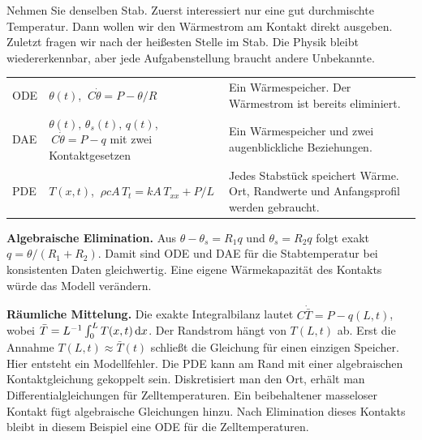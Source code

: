 Nehmen Sie denselben Stab. Zuerst interessiert nur eine gut durchmischte Temperatur. Dann wollen wir den Wärmestrom am Kontakt direkt ausgeben. Zuletzt fragen wir nach der heißesten Stelle im Stab. Die Physik bleibt wiedererkennbar, aber jede Aufgabenstellung braucht andere Unbekannte.
{\tblstart\begin{tabularx}{\linewidth}{@{}P{17mm}YY@{}}\toprule
{}&&\\\midrule
ODE&\(\theta(t)\), \(\ C\dot\theta=P-\theta/R\)&Ein Wärmespeicher. Der Wärmestrom ist bereits eliminiert.\\
DAE&\(\theta(t),\,\theta_s(t),\,q(t)\), \(\ C\dot\theta=P-q\) mit zwei Kontaktgesetzen&Ein Wärmespeicher und zwei augenblickliche Beziehungen.\\
PDE&\(T(x,t)\), \(\ \rho c A\,T_t=kA\,T_{xx}+P/L\)&Jedes Stabstück speichert Wärme. Ort, Randwerte und Anfangsprofil werden gebraucht.\\\bottomrule
\end{tabularx}\par}
\textbf{Algebraische Elimination.} Aus \(\theta-\theta_s=R_1q\) und \(\theta_s=R_2q\) folgt exakt \(q=\theta/(R_1+R_2)\). Damit sind ODE und DAE für die Stabtemperatur bei konsistenten Daten gleichwertig. Eine eigene Wärmekapazität des Kontakts würde das Modell verändern.

\textbf{Räumliche Mittelung.} Die exakte Integralbilanz lautet \(C\dot{\bar T}=P-q(L,t)\), wobei \(\bar T=L^{-1}\int_0^L T(x,t)\,\mathrm{d} x\). Der Randstrom hängt von \(T(L,t)\) ab. Erst die Annahme \(T(L,t)\approx\bar T(t)\) schließt die Gleichung für einen einzigen Speicher. Hier entsteht ein Modellfehler.
Die PDE kann am Rand mit einer algebraischen Kontaktgleichung gekoppelt sein. Diskretisiert man den Ort, erhält man Differentialgleichungen für Zelltemperaturen. Ein beibehaltener masseloser Kontakt fügt algebraische Gleichungen hinzu. Nach Elimination dieses Kontakts bleibt in diesem Beispiel eine ODE für die Zelltemperaturen.

